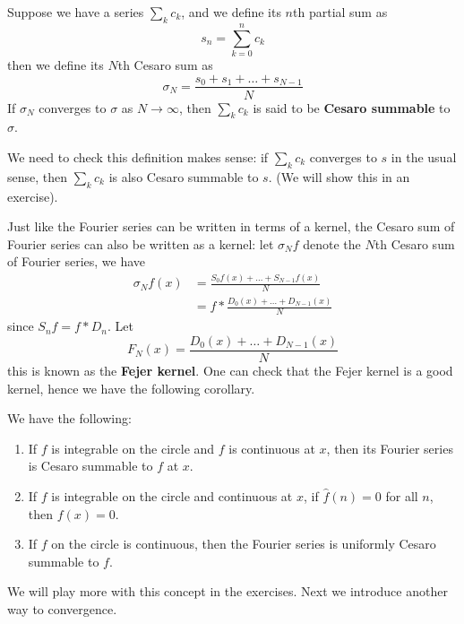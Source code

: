 \begin{defn}
    Suppose we have a series $\sum_{k}c_k$, and we define its $n$th partial sum as 
    \begin{equation*}
        s_n=\sum_{k=0}^n c_k
    \end{equation*}
    then we define its $N$th Cesaro sum as 
    \begin{equation*}
        \sigma_N=\frac{s_0+s_1+\dots+s_{N-1}}{N}
    \end{equation*}
    If $\sigma_N$ converges to $\sigma$ as $N\to\infty$, then $\sum_kc_k$ is said to be \textbf{Cesaro summable} to $\sigma$. 
\end{defn}
We need to check this definition makes sense: if $\sum_kc_k$ converges to $s$ in the usual sense, then $\sum_kc_k$ is also Cesaro summable to $s$. (We will show this in an exercise).

\noindent
Just like the Fourier series can be written in terms of a kernel, the Cesaro sum of Fourier series can also be written as a kernel: let $\sigma_Nf$ denote the $N$th Cesaro sum of Fourier series, we have
\begin{align*}
    \sigma_Nf(x)&=\frac{S_0f(x)+\dots+S_{N-1}f(x)}{N}\\
    &=f\ast\frac{D_0(x)+\dots+D_{N-1}(x)}{N}
\end{align*}
since $S_nf=f\ast D_n$. Let 
\begin{equation*}
    F_N(x)=\frac{D_0(x)+\dots+D_{N-1}(x)}{N}
\end{equation*}
this is known as the \textbf{Fejer kernel}. One can check that the Fejer kernel is a good kernel, hence we have the following corollary.
\begin{cor}
    We have the following:
    \begin{enumerate}
        \item  If $f$ is integrable on the circle and $f$ is continuous at $x$, then its Fourier series is Cesaro summable to $f$ at $x$.
        \item If $f$ is integrable on the circle and continuous at $x$, if $\hat{f}(n)=0$ for all $n$, then $f(x)=0$.
        \item If $f$ on the circle is continuous, then the Fourier series is uniformly Cesaro summable to $f$.
    \end{enumerate}
\end{cor}
We will play more with this concept in the exercises. Next we introduce another way to convergence.

